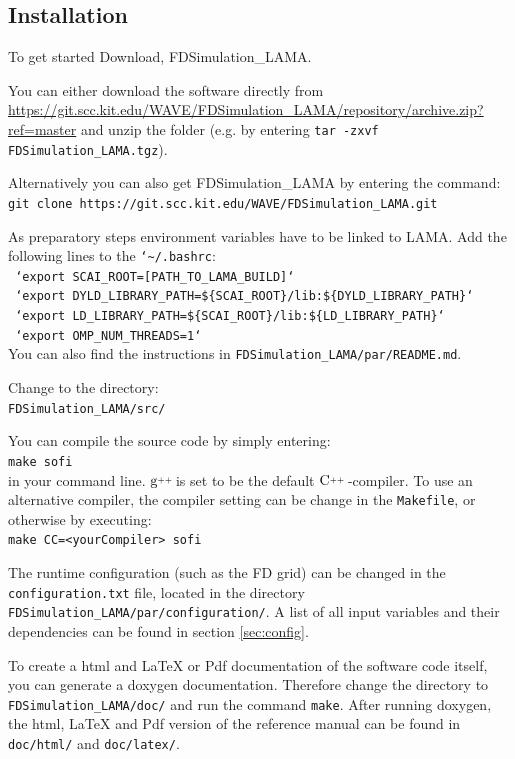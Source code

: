 \documentclass[pdftex,a4paper,parskip,listof=totoc,bibliography=totoc,onehalfspacing,12pt]{scrreprt}
\newcommand{\CC}[1][]{$\text{C\hspace{0ex}}^{_{_{_{++}}}}					%
                      \ifthenelse{\equal{#1}{}}{}{\text{\hspace{-.625ex}#1}}$}
\newcommand{\gCC}[1][]{$\text{g\hspace{0ex}}^{_{_{_{++}}}}				%
                      \ifthenelse{\equal{#1}{}}{}{\text{\hspace{-.25ex}(#1)}}$}
\newcommand{\shellcmd}[1]{\indent\indent\texttt{#1}}	%
\newcommand{\shellcmdline}[1]{\indent\indent\texttt{\quad#1}} 	%
\begin{document}
\subsection{Installation}
To get started Download, FDSimulation\_LAMA. 

You can either download the software directly from \url{https://git.scc.kit.edu/WAVE/FDSimulation_LAMA/repository/archive.zip?ref=master} and unzip the folder (e.g. by entering \shellcmd{tar -zxvf FDSimulation\_LAMA.tgz}).

Alternatively you can also get FDSimulation\_LAMA by entering the command: \\\shellcmdline{git clone https://git.scc.kit.edu/WAVE/FDSimulation\_LAMA.git}

As preparatory steps environment variables have to be linked to LAMA. Add the following lines to the \shellcmd{{\char`\~}/.bashrc}:
\\\shellcmdline{ `export SCAI\_ROOT=[PATH\_TO\_LAMA\_BUILD]`}
\\\shellcmdline{ `export DYLD\_LIBRARY\_PATH=\$\{SCAI\_ROOT\}/lib:\$\{DYLD\_LIBRARY\_PATH\}`}
\\\shellcmdline{ `export LD\_LIBRARY\_PATH=\$\{SCAI\_ROOT\}/lib:\$\{LD\_LIBRARY\_PATH\}`}
\\\shellcmdline{ `export OMP\_NUM\_THREADS=1`}\\
You can also find the instructions in \shellcmd{FDSimulation\_LAMA/par/README.md}. 

Change to the directory: \\\shellcmdline{FDSimulation\_LAMA/src/}

You can compile the source code by simply entering: \\\shellcmdline{make sofi}\\ in your command line. \gCC is set to be the default \CC-compiler. To use an alternative compiler, the compiler setting can be change in the \shellcmd{Makefile}, or otherwise by executing:\\\shellcmdline{make CC=<yourCompiler> sofi}

The runtime configuration (such as the FD grid) can be changed in the \shellcmd{configuration.txt} file, located in the directory \shellcmd{FDSimulation\_LAMA/par/configuration/}. A list of all input variables and their dependencies can be found in section \ref{sec:config}. 

To create a html and LaTeX or Pdf documentation of the software code itself, you can generate a doxygen documentation. Therefore change the directory to \shellcmd{FDSimulation\_LAMA/doc/} and run the command \shellcmd{make}. After running doxygen, the html, LaTeX and Pdf version of the reference manual can be found in \shellcmd{doc/html/} and \shellcmd{doc/latex/}.
\end{document}
